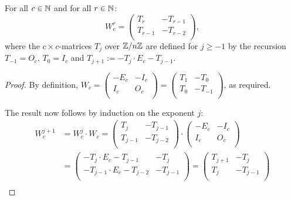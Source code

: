 \begin{lemma}\label{lem_struc}
  For all $c\in\mathbb{N}$ and for all $r\in\mathbb{N}$:
  \[
  W_{c}^{r}
  =
  \left(
  \begin{array}{cc}
    T_{r}   & -T_{r-1} \\
    T_{r-1} & -T_{r-2} \\
  \end{array}
  \right),
  \]
  where the $c\times c$-matrices $T_j$ over $\mathbb{Z}/n\mathbb{Z}$ are defined for
$j\geq -1$ by the recursion $T_{-1}=O_c$, $T_0=I_c$ and $T_{j+1} := -T_{j}\cdot E_{c} - T_{j-1}.$
\end{lemma}

\begin{proof}
By definition,
$W_{c}= \left(\begin{smallmatrix} -E_c & -I_c \\ I_c & O_c \\\end{smallmatrix}\right) = \left(\begin{smallmatrix} T_{1} & -T_{0} \\ T_{0} & -T_{-1} \\\end{smallmatrix}\right)$, as required.

The result now follows by induction on the exponent $j$:
  \[
  \begin{aligned}
  W_{c}^{j+1}
  & = W_{c}^{j} \cdot W_{c}
  =
  \left(
  \begin{array}{cc}
    T_{j}   & -T_{j-1} \\
    T_{j-1} & -T_{j-2} \\
  \end{array}
  \right)
  \cdot
  \left(
  \begin{array}{cc}
    -E_{c} & -I_{c} \\
     I_{c} &  O_{c} \\
  \end{array}
  \right)\\
  & =
  \left(
  \begin{array}{cc}
    -T_{j}  \cdot E_{c} - T_{j-1} & -T_{j}   \\
    -T_{j-1}\cdot E_{c} - T_{j-2} & -T_{j-1} \\
  \end{array}
  \right) 
  =
  \left(
  \begin{array}{cc}
     T_{j+1} & -T_{j}   \\
     T_{j}   & -T_{j-1} \\
  \end{array}
  \right) \\
  \end{aligned}
  \]
\end{proof}
%
